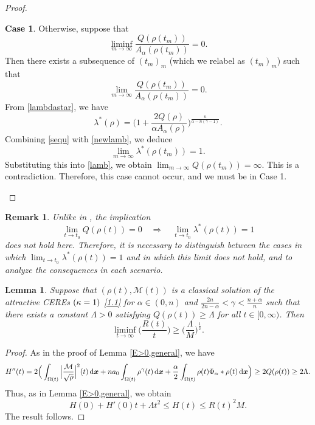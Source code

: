 \documentclass[reqno,11pt]{amsart}
\numberwithin{equation}{section}
\newtheorem{lemma}[theorem]{Lemma}
\newtheorem{remark}[theorem]{Remark}
\theoremstyle{definition}
\newtheorem{case}{Case}
\def\dd{{\, \rm d}}
\begin{document}
\begin{proof}
\begin{case}
    Otherwise, suppose that
    \begin{equation*}
 \liminf_{m \to \infty} \frac{Q(\rho(t_m))}{A_\alpha(\rho(t_m))} = 0.
    \end{equation*}
    Then there exists a subsequence of $(t_m)_m$ (which we relabel as $(t_m)_m$) such that
    \begin{equation}\label{sequ}
  \lim_{m \to \infty} \frac{Q(\rho(t_m))}{A_\alpha(\rho(t_m))} = 0.
    \end{equation}
From \eqref{lambdastar}, we have
    \begin{equation}\label{newlamb}
 \lambda^*(\rho) = \Big( 1 + \frac{2 Q(\rho)}{\alpha A_\alpha(\rho)} \Big)^\frac{n}{\alpha - n(\gamma - 1)}.
    \end{equation}
Combining \eqref{sequ} with \eqref{newlamb}, 
we deduce 
$$
\lim_{m \to \infty} \lambda^*(\rho(t_m)) = 1.
$$ 
Substituting this into \eqref{lamb}, we obtain 
$\lim_{m \to \infty} Q(\rho(t_m)) = \infty$.
This is a contradiction.
Therefore, this case cannot occur, and we must be in Case 1.
\end{case}
\setcounter{case}{0}
\end{proof}

\begin{remark}
 Unlike in {\rm\cite{Cheng_2025}}, the implication
 $$
 \lim_{t \to t_0} Q(\rho(t)) = 0
 \quad\Longrightarrow \quad \lim_{t \to t_0} \lambda^*(\rho(t)) = 1 
 $$
 does not hold here.
 Therefore, it is necessary to distinguish between the cases 
 in which $\lim_{t \to t_0} \lambda^*(\rho(t)) = 1$ and in which this limit does not hold, and to
 analyze the consequences in each scenario.
\end{remark}

\begin{lemma}\label{asymlem}
    Suppose that  $(\rho(t),\mathcal{M}(t))$ is a classical solution of the attractive CEREs ${\rm (\kappa = 1)}$ \eqref{1.1}
    for $\alpha \in (0,n)$ and $\frac{2n}{2n - \alpha} < \gamma < \frac{n + \alpha}{n}$ 
    such that there exists a constant $\Lambda > 0$ 
    satisfying $Q(\rho(t)) \geq \Lambda$ for all $t \in [0,\infty)$. Then 
    \[
    \liminf_{t \to \infty} \Big ( \frac{R(t)}{t} \Big ) \geq \Big ( \frac{\Lambda}{M} \Big )^\frac{1}{2}.
    \]
\end{lemma}

\begin{proof}
    As in the proof of Lemma \ref{E>0,general}, we have 
    \[
  H''(t) = 2\Big(\int_{\Omega(t)}\Big| \frac{\mathcal{M}}{\sqrt{\rho}} \Big|^2(t) \dd \boldsymbol{x}+na_0\int_{\Omega(t)}\rho^\gamma(t)\dd \boldsymbol{x} + \frac{\alpha}{2} \int_{\Omega(t)}\rho(t) \Phi_\alpha\ast\rho(t)\dd \boldsymbol{x}\Big) \geq 2Q(\rho(t)) \geq 2\Lambda.
    \]
    Thus, as in Lemma \ref{E>0,general}, we obtain
    \[
    H(0)+H'(0)t+\Lambda t^2\leq H(t)\leq R(t)^2M.
    \]
    The result follows.
\end{proof}
\end{document}
